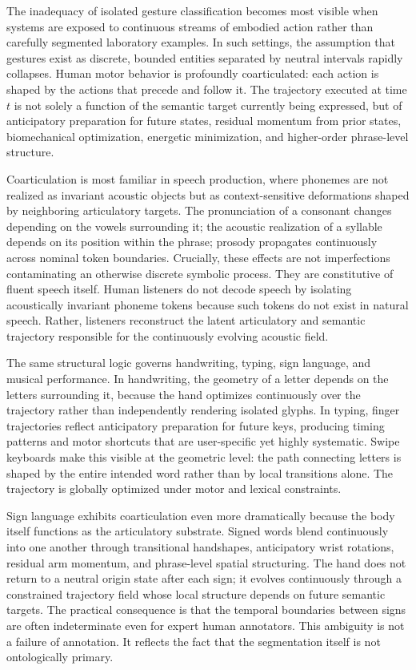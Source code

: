 \documentclass[11pt, a4paper]{article}
\theoremstyle{definition}
\begin{document}
The inadequacy of isolated gesture classification becomes most visible when systems are exposed to continuous streams of embodied action rather than carefully segmented laboratory examples. In such settings, the assumption that gestures exist as discrete, bounded entities separated by neutral intervals rapidly collapses. Human motor behavior is profoundly coarticulated: each action is shaped by the actions that precede and follow it. The trajectory executed at time \(t\) is not solely a function of the semantic target currently being expressed, but of anticipatory preparation for future states, residual momentum from prior states, biomechanical optimization, energetic minimization, and higher-order phrase-level structure.

Coarticulation is most familiar in speech production, where phonemes are not realized as invariant acoustic objects but as context-sensitive deformations shaped by neighboring articulatory targets. The pronunciation of a consonant changes depending on the vowels surrounding it; the acoustic realization of a syllable depends on its position within the phrase; prosody propagates continuously across nominal token boundaries. Crucially, these effects are not imperfections contaminating an otherwise discrete symbolic process. They are constitutive of fluent speech itself. Human listeners do not decode speech by isolating acoustically invariant phoneme tokens because such tokens do not exist in natural speech. Rather, listeners reconstruct the latent articulatory and semantic trajectory responsible for the continuously evolving acoustic field.

The same structural logic governs handwriting, typing, sign language, and musical performance. In handwriting, the geometry of a letter depends on the letters surrounding it, because the hand optimizes continuously over the trajectory rather than independently rendering isolated glyphs. In typing, finger trajectories reflect anticipatory preparation for future keys, producing timing patterns and motor shortcuts that are user-specific yet highly systematic. Swipe keyboards make this visible at the geometric level: the path connecting letters is shaped by the entire intended word rather than by local transitions alone. The trajectory is globally optimized under motor and lexical constraints.

Sign language exhibits coarticulation even more dramatically because the body itself functions as the articulatory substrate. Signed words blend continuously into one another through transitional handshapes, anticipatory wrist rotations, residual arm momentum, and phrase-level spatial structuring. The hand does not return to a neutral origin state after each sign; it evolves continuously through a constrained trajectory field whose local structure depends on future semantic targets. The practical consequence is that the temporal boundaries between signs are often indeterminate even for expert human annotators. This ambiguity is not a failure of annotation. It reflects the fact that the segmentation itself is not ontologically primary.
\end{document}

